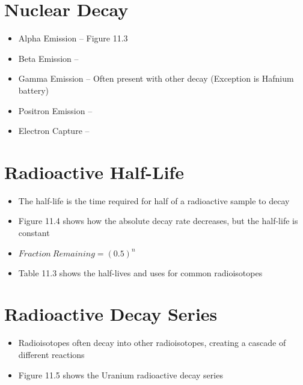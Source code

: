 \documentclass[12pt, openany, letterpaper]{memoir}
\begin{document}
\section{Nuclear Decay}
\begin{itemize}
	\item Alpha Emission -- Figure 11.3
	
	
	\item Beta Emission -- ~~ 
	
	
	\item Gamma Emission -- Often present with other decay (Exception is Hafnium battery)
	
	\item Positron Emission -- ~~ 
	
	\item Electron Capture -- ~~ 
	
\end{itemize}
\section{Radioactive Half-Life}
\begin{itemize}
	\item The half-life is the time required for half of a radioactive sample to decay
	\item Figure 11.4 shows how the absolute decay rate decreases, but the half-life is constant
	\item $Fraction~Remaining = \left(0.5\right)^{n}$
	\item Table 11.3 shows the half-lives and uses for common radioisotopes
\end{itemize}
\section{Radioactive Decay Series}
\begin{itemize}
	\item Radioisotopes often decay into other radioisotopes, creating a cascade of different reactions
	\item Figure 11.5 shows the Uranium radioactive decay series
\end{itemize}
\end{document}
